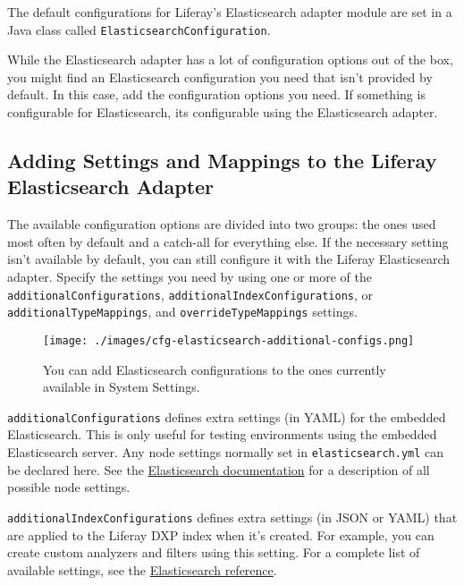 The default configurations for Liferay's Elasticsearch adapter module
are set in a Java class called \texttt{ElasticsearchConfiguration}.

While the Elasticsearch adapter has a lot of configuration options out
of the box, you might find an Elasticsearch configuration you need that
isn't provided by default. In this case, add the configuration options
you need. If something is configurable for Elasticsearch, its
configurable using the Elasticsearch adapter.

\subsection{Adding Settings and Mappings to the Liferay Elasticsearch
Adapter}\label{adding-settings-and-mappings-to-the-liferay-elasticsearch-adapter-1}

The available configuration options are divided into two groups: the
ones used most often by default and a catch-all for everything else. If
the necessary setting isn't available by default, you can still
configure it with the Liferay Elasticsearch adapter. Specify the
settings you need by using one or more of the
\texttt{additionalConfigurations},
\texttt{additionalIndexConfigurations}, or
\texttt{additionalTypeMappings}, and \texttt{overrideTypeMappings}
settings.

\begin{figure}
\centering
\texttt{[image: ./images/cfg-elasticsearch-additional-configs.png]}
\caption{You can add Elasticsearch configurations to the ones currently
available in System Settings.}
\end{figure}

\texttt{additionalConfigurations} defines extra settings (in YAML) for
the embedded Elasticsearch. This is only useful for testing environments
using the embedded Elasticsearch server. Any node settings normally set
in \texttt{elasticsearch.yml} can be declared here. See the
\href{https://www.elastic.co/guide/en/elasticsearch/reference/6.1/index.html}{Elasticsearch
documentation} for a description of all possible node settings.

\texttt{additionalIndexConfigurations} defines extra settings (in JSON
or YAML) that are applied to the Liferay DXP index when it's created.
For example, you can create custom analyzers and filters using this
setting. For a complete list of available settings, see the
\href{https://www.elastic.co/guide/en/elasticsearch/reference/6.1/index-modules.html}{Elasticsearch
reference}.

